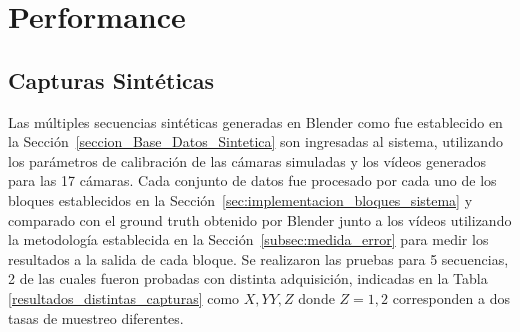 \section{Performance}\label{seccion_performance}

\subsection{Capturas Sintéticas}

Las múltiples secuencias sintéticas generadas en Blender como fue establecido en la Sección~\ref{seccion_Base_Datos_Sintetica} son ingresadas al sistema, utilizando los parámetros de calibración de las cámaras simuladas y los vídeos generados para las 17 cámaras. Cada conjunto de datos fue procesado por cada uno de los bloques establecidos en la Sección~\ref{sec:implementacion_bloques_sistema} y comparado con el ground truth obtenido por Blender junto a los vídeos utilizando la metodología establecida en la Sección~\ref{subsec:medida_error} para medir los resultados a la salida de cada bloque. Se realizaron las pruebas para 5 secuencias, 2 de las cuales fueron probadas con distinta adquisición, indicadas en la Tabla \ref{resultados_distintas_capturas} como $X,YY,Z$ donde $Z=1,2$ corresponden a dos tasas de muestreo diferentes.

